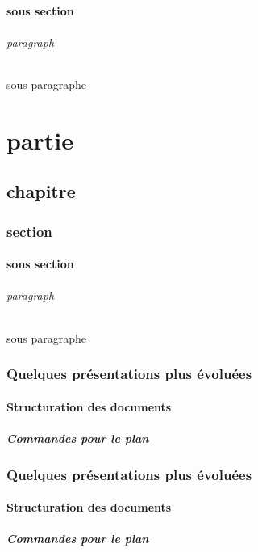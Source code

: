 \documentclass{report}
\begin{document}
\subsection{sous section}
\paragraph{paragraph}
\subparagraph{sous paragraphe}

\part{partie}
\chapter{chapitre}
\section{section}
\subsection{sous section}
\paragraph{paragraph}
\subparagraph{sous paragraphe}

\section{Quelques présentations plus évoluées}
\subsection{Structuration des documents}
\subsubsection{Commandes pour le plan}

\section{Quelques présentations plus évoluées}
\subsection{Structuration des documents}
\subsubsection{Commandes pour le plan}
\end{document}
